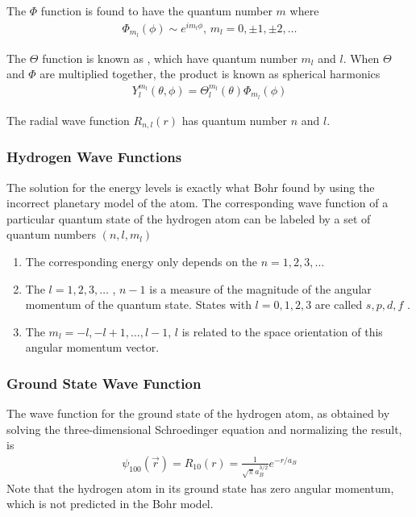 The $\Phi$ function is found to have the quantum number $m$ where
\begin{align*}
    \Phi_{m_l}(\phi)\sim e^{im_l \phi} ,\, m_l=0,\pm 1,\pm 2, \dots
\end{align*}

The $\Theta$ function is known as , which have quantum number $m_l$ and $l$. When $\Theta$ and $\Phi$ are multiplied together, the product is known as spherical harmonics
\begin{align*}
    Y_l^{m_l}(\theta,\phi)=\Theta_l^{m_l}(\theta)\Phi_{m_l}(\phi)
\end{align*}

The radial wave function $R_{n,l}(r)$ has quantum number $n$ and $l$. 

\subsubsection{Hydrogen Wave Functions}
The solution for the energy levels is exactly what Bohr found by using the incorrect planetary model of the atom. The corresponding wave function of a particular quantum state of the hydrogen atom can be labeled by a set of quantum numbers $(n,l,m_l)$
\begin{enumerate}
    \item The corresponding energy only depends on the  $n=1,2,3,\dots$
    \item The  $l=1,2,3,\dots$ , $n-1$ is a measure of the magnitude of the angular momentum of the quantum state. States with $l = 0, 1, 2, 3$ are called $s, p, d, f$ .
    \item The  $m_l=-l,-l+1,\dots,l-1$, $l$ is related to the space orientation of this angular momentum vector.
\end{enumerate}

\subsubsection{Ground State Wave Function}
The wave function for the ground state of the hydrogen atom, as obtained by solving the three-dimensional Schroedinger equation and normalizing the result, is
\begin{align*}
    \psi_{100}(\vec{r})=R_{10}(r)=\frac{1}{\sqrt{\pi}a_B^{3/2}}e^{-r/a_B}
\end{align*}
Note that the hydrogen atom in its ground state has zero angular momentum, which is not predicted in the Bohr model. 

